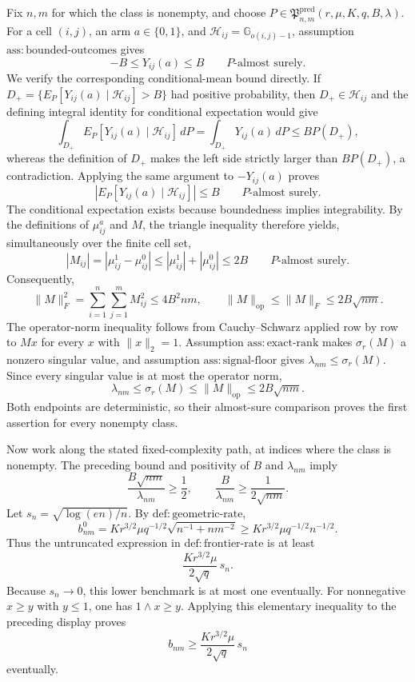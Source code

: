 Fix \(n,m\) for which the class is nonempty, and choose
\(P\in\mathfrak P^{\mathrm{pred}}_{n,m}(r,\mu,K,q,B,\lambda)\).
For a cell \((i,j)\), an arm \(a\in\{0,1\}\), and
\(\mathcal H_{ij}=\mathbb G_{o(i,j)-1}\), assumption
\(\mathrm{ass:bounded\mbox{-}outcomes}\) gives
\[
 -B\le Y_{ij}(a)\le B\qquad P\text{-almost surely}.
\]
We verify the corresponding conditional-mean bound directly.  If
\(D_+=\{E_P[Y_{ij}(a)\mid\mathcal H_{ij}]>B\}\) had positive probability, then \(D_+\in\mathcal H_{ij}\) and the defining integral identity for conditional expectation would give
\[
 \int_{D_+}E_P[Y_{ij}(a)\mid\mathcal H_{ij}]\,dP
 =\int_{D_+}Y_{ij}(a)\,dP
 \le B P(D_+),
\]
whereas the definition of \(D_+\) makes the left side strictly larger than \(BP(D_+)\), a contradiction.  Applying the same argument to \(-Y_{ij}(a)\) proves
\[
 \left|E_P[Y_{ij}(a)\mid\mathcal H_{ij}]\right|\le B
 \qquad P\text{-almost surely}.
\]
The conditional expectation exists because boundedness implies integrability.  By the definitions of \(\mu^a_{ij}\) and \(M\), the triangle inequality therefore yields, simultaneously over the finite cell set,
\[
 |M_{ij}|=|\mu^1_{ij}-\mu^0_{ij}|
 \le |\mu^1_{ij}|+|\mu^0_{ij}|\le2B
 \qquad P\text{-almost surely}.
\]
Consequently,
\[
 \lVert M\rVert_F^2=\sum_{i=1}^n\sum_{j=1}^mM_{ij}^2
 \le4B^2nm,
 \qquad
 \lVert M\rVert_{\mathrm{op}}\le\lVert M\rVert_F\le2B\sqrt{nm}.
\]
The operator-norm inequality follows from Cauchy--Schwarz applied row by row to \(Mx\) for every \(x\) with \(\lVert x\rVert_2=1\).  Assumption \(\mathrm{ass:exact\mbox{-}rank}\) makes \(\sigma_r(M)\) a nonzero singular value, and assumption \(\mathrm{ass:signal\mbox{-}floor}\) gives \(\lambda_{nm}\le\sigma_r(M)\).  Since every singular value is at most the operator norm,
\[
 \lambda_{nm}\le\sigma_r(M)\le\lVert M\rVert_{\mathrm{op}}
 \le2B\sqrt{nm}.
\]
Both endpoints are deterministic, so their almost-sure comparison proves the first assertion for every nonempty class.

Now work along the stated fixed-complexity path, at indices where the class is nonempty.  The preceding bound and positivity of \(B\) and \(\lambda_{nm}\) imply
\[
 \frac{B\sqrt{nm}}{\lambda_{nm}}\ge\frac12,
 \qquad
 \frac B{\lambda_{nm}}\ge\frac1{2\sqrt{nm}}.
\]
Let \(s_n=\sqrt{\log(en)/n}\).  By
\(\mathrm{def:geometric\mbox{-}rate}\),
\[
 b^0_{nm}
 =K r^{3/2}\mu q^{-1/2}\sqrt{n^{-1}+nm^{-2}}
 \ge K r^{3/2}\mu q^{-1/2}n^{-1/2}.
\]
Thus the untruncated expression in
\(\mathrm{def:frontier\mbox{-}rate}\) is at least
\[
 \frac{K r^{3/2}\mu}{2\sqrt q}\,s_n.
\]
Because \(s_n\to0\), this lower benchmark is at most one eventually.  For nonnegative \(x\ge y\) with \(y\le1\), one has \(1\wedge x\ge y\).  Applying this elementary inequality to the preceding display proves
\[
 b_{nm}\ge
 \frac{K r^{3/2}\mu}{2\sqrt q}\,s_n
\]
eventually.

